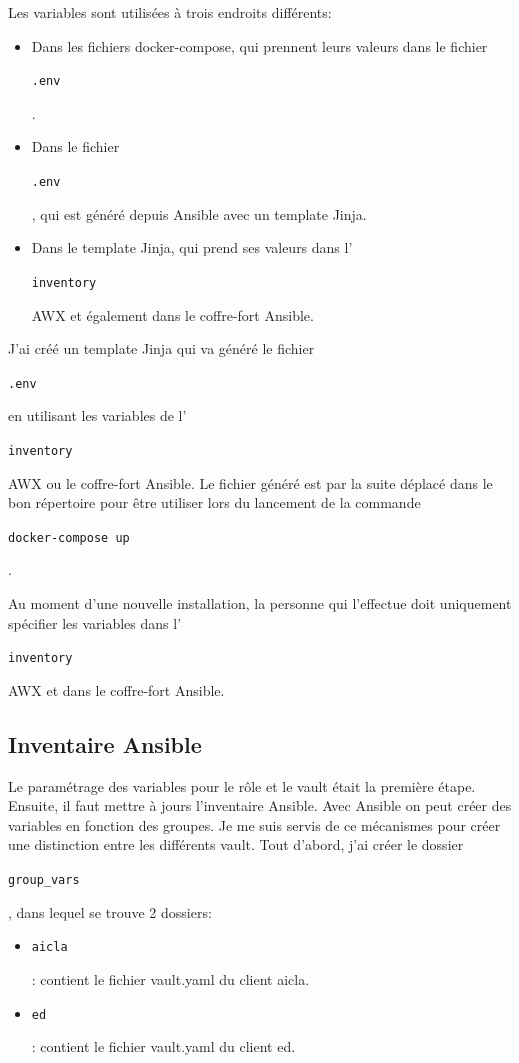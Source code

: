 \documentclass[12pt, a4paper, twoside]{article}
\begin{document}
Les variables sont utilisées à trois endroits différents:
\begin{itemize}
    \item Dans les fichiers docker-compose, qui prennent leurs valeurs dans le fichier \begin{code}\texttt{.env}\end{code}.
    \item Dans le fichier \begin{code}\texttt{.env}\end{code}, qui est généré depuis \gls{Ansible} avec un template \gls{Jinja}.
    \item Dans le template \gls{Jinja}, qui prend ses valeurs dans l'\begin{code}\texttt{inventory}\end{code} AWX et également dans le coffre-fort \gls{Ansible}.
\end{itemize}

J'ai créé un template \gls{Jinja} qui va généré le fichier \begin{code}\texttt{.env}\end{code} en utilisant les variables de l'\begin{code}\texttt{inventory}\end{code} AWX ou le coffre-fort \gls{Ansible}.
Le fichier généré est par la suite déplacé dans le bon répertoire pour être utiliser lors du lancement de la commande \begin{code}\texttt{docker-compose up}\end{code}. 

Au moment d'une nouvelle installation, la personne qui l'effectue doit uniquement spécifier les variables dans l'\begin{code}\texttt{inventory}\end{code} AWX et dans le coffre-fort \gls{Ansible}.

\subsection{Inventaire Ansible}
Le paramétrage des variables pour le rôle et le vault était la première étape. 
Ensuite, il faut mettre à jours l'inventaire \gls{Ansible}.
Avec \gls{Ansible} on peut créer des variables en fonction des groupes.
Je me suis servis de ce mécanismes pour créer une distinction entre les différents vault.
Tout d'abord, j'ai créer le dossier \begin{code}\texttt{group\_vars}\end{code}, dans lequel se trouve 2 dossiers:
\begin{itemize}
    \item  \begin{code}\texttt{aicla}\end{code}: contient le fichier vault.yaml du client aicla.
    \item  \begin{code}\texttt{ed}\end{code}: contient le fichier vault.yaml du client ed.
\end{itemize}
\end{document}
